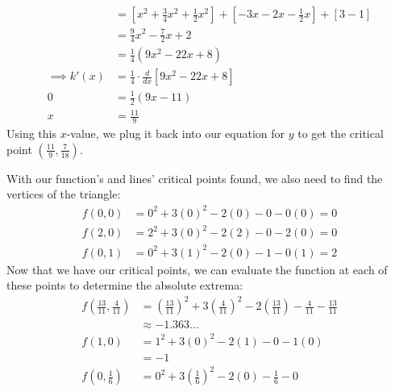 \documentclass[11pt]{article}
\begin{document}
\begin{enumerate}
{\begin{enumerate}[label=(\(\ell_{\arabic*}\)):]
\begin{align*}
                                   & = \left[x^{2} + \tfrac{3}{4}x^{2} + \tfrac{1}{2}x^{2}\right] + \left[-3x - 2x - \tfrac{1}{2}x\right] + \left[3 - 1\right]      \\
                                   & = \tfrac{9}{4}x^{2} - \tfrac{7}{2}x + 2                                                                                        \\
                                   & = \tfrac{1}{4}(9x^{2} - 22x + 8)                                                                                               \\
                    \implies k'(x) & = \tfrac{1}{4} \cdot \tfrac{d}{dx}[9x^{2} - 22x + 8]                                                                           \\
                    0              & = \tfrac{1}{2}(9x - 11)                                                                                                        \\
                    x              & = \tfrac{11}{9}
                  \end{align*}
                  Using this \(x\)-value, we plug it back into our equation for \(y\) to get the critical point \(\boxed{\left(\frac{11}{9}, \frac{7}{18}\right)}\).
          \end{enumerate}
          With our function's and lines' critical points found, we also need to find the vertices of the triangle:
          \begin{align*}
            f(0,0) & = 0^{2} + 3(0)^{2} - 2(0) - 0 - 0(0) = 0 \\
            f(2,0) & = 2^{2} + 3(0)^{2} - 2(2) - 0 - 2(0) = 0 \\
            f(0,1) & = 0^{2} + 3(1)^{2} - 2(0) - 1 - 0(1) = 2
          \end{align*}          
          Now that we have our critical points, we can evaluate the function at each of these points to determine the absolute extrema:
          \begin{align*}
            f\left(\tfrac{13}{11}, \tfrac{4}{11}\right) & = \left(\tfrac{13}{11}\right)^{2} + 3\left(\tfrac{4}{11}\right)^{2} - 2\left(\tfrac{13}{11}\right) - \tfrac{4}{11} - \tfrac{13}{11} \\
            &\approx -1.363\ldots \\
            f(1,0) & = 1^{2} + 3(0)^{2} - 2(1) - 0 - 1(0) \\
            &= -1 \\
            f\left(0, \tfrac{1}{6}\right)              & = 0^{2} + 3\left(\tfrac{1}{6}\right)^{2} - 2(0) - \tfrac{1}{6} - 0\\

\end{align*}}
\end{enumerate}
\end{document}
